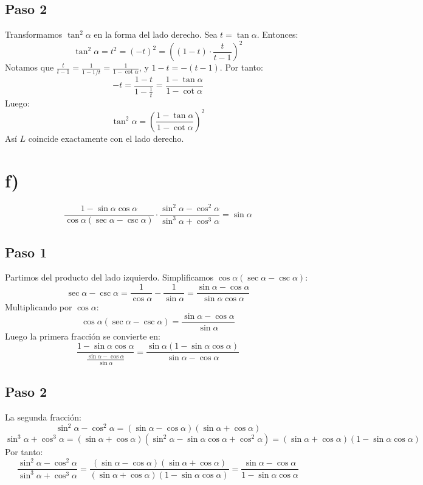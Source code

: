 \documentclass[12pt,a4paper]{article}
\begin{document}
\subsection*{Paso 2}
Transformamos \(\tan^2\alpha\) en la forma del lado derecho. Sea \(t = \tan\alpha\). Entonces:
\[
\tan^2\alpha = t^2 = (-t)^2 = \left( (1-t)\cdot\frac{t}{t-1} \right)^2
\]
Notamos que \(\frac{t}{t-1} = \frac{1}{1 - 1/t} = \frac{1}{1-\cot\alpha}\), y \(1-t = -(t-1)\). Por tanto:
\[
-t = \frac{1-t}{1 - \frac1t} = \frac{1-\tan\alpha}{1-\cot\alpha}
\]
Luego:
\[
\tan^2\alpha = \left( \frac{1-\tan\alpha}{1-\cot\alpha} \right)^2
\]
Así \(L\) coincide exactamente con el lado derecho.

\newpage
\section*{f)}

\begin{identidad}
\[
\frac{
1-\sin\alpha\cos\alpha
}{
\cos\alpha(\sec\alpha-\csc\alpha)
}
\cdot
\frac{
\sin^2\alpha-\cos^2\alpha
}{
\sin^3\alpha+\cos^3\alpha
}
=
\sin\alpha
\]
\end{identidad}

\subsection*{Paso 1}
Partimos del producto del lado izquierdo. Simplificamos \(\cos\alpha(\sec\alpha-\csc\alpha)\):
\[
\sec\alpha-\csc\alpha = \frac{1}{\cos\alpha}-\frac{1}{\sin\alpha}
= \frac{\sin\alpha-\cos\alpha}{\sin\alpha\cos\alpha}
\]
Multiplicando por \(\cos\alpha\):
\[
\cos\alpha(\sec\alpha-\csc\alpha) = \frac{\sin\alpha-\cos\alpha}{\sin\alpha}
\]
Luego la primera fracción se convierte en:
\[
\frac{1-\sin\alpha\cos\alpha}{\frac{\sin\alpha-\cos\alpha}{\sin\alpha}}
= \frac{\sin\alpha(1-\sin\alpha\cos\alpha)}{\sin\alpha-\cos\alpha}
\]

\subsection*{Paso 2}
La segunda fracción:
\[
\sin^2\alpha-\cos^2\alpha = (\sin\alpha-\cos\alpha)(\sin\alpha+\cos\alpha)
\]
\[
\sin^3\alpha+\cos^3\alpha = (\sin\alpha+\cos\alpha)(\sin^2\alpha-\sin\alpha\cos\alpha+\cos^2\alpha)
= (\sin\alpha+\cos\alpha)(1-\sin\alpha\cos\alpha)
\]
Por tanto:
\[
\frac{\sin^2\alpha-\cos^2\alpha}{\sin^3\alpha+\cos^3\alpha}
= \frac{(\sin\alpha-\cos\alpha)(\sin\alpha+\cos\alpha)}{(\sin\alpha+\cos\alpha)(1-\sin\alpha\cos\alpha)}
= \frac{\sin\alpha-\cos\alpha}{1-\sin\alpha\cos\alpha}
\]
\end{document}
